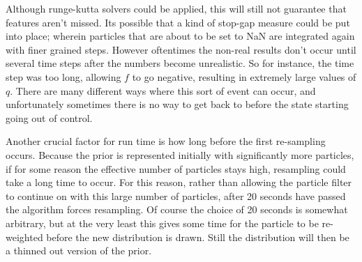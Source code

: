 Although runge-kutta solvers could be applied, this will still not
guarantee that features aren't missed. Its possible that a
kind of stop-gap measure could be put into place; wherein particles that are
about to be set to NaN are integrated again with finer grained steps. However
oftentimes the non-real results don't occur until several time steps after the 
numbers become unrealistic. So for instance, the time step was too long, allowing 
$f$ to go negative, resulting in extremely large values of $q$. There are many
different ways where this sort of event can occur, and unfortunately sometimes
there is no way to get back to before the state starting going out of control.

Another crucial factor for run time is how long before the first re-sampling 
occurs. Because the prior is represented initially with significantly more
particles, if for some reason the effective
number of particles stays high, resampling could take a long time to occur.
For this reason, rather than allowing the particle filter to continue on 
with this large number of particles, after 20 seconds have passed the
algorithm forces resampling. Of course the choice of 20 seconds is somewhat
arbitrary, but at the very least this gives some time for the particle to
be re-weighted before the new distribution is drawn. Still the
distribution will then be a thinned out version of the prior. 



